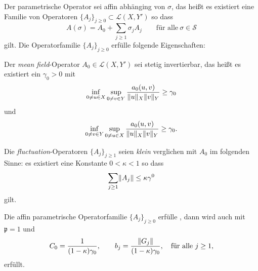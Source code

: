 \begin{Annahme}
    \label{thm:kunoth:assumption2}
    Der parametrische Operator sei affin abhänging von $\sigma$, das heißt es existiert eine Familie von Operatoren $\{A_{j}\}_{j \geq 0} \subset \mathcal L(X, Y')$ so dass
    \begin{equation}
        A(\sigma) = A_{0} + \sum_{j \geq 1} \sigma_{j} A_{j} \qquad\text{für alle}~\sigma \in \mathcal S
    \end{equation}
    gilt.
    Die Operatorfamilie $\{ A_{j} \}_{j \geq 0}$ erfülle folgende Eigenschaften:
    \begin{thmenumerate}
        \item Der \emph{mean field}-Operator $A_{0} \in \mathcal L(X, Y')$ sei stetig invertierbar, das heißt es existiert ein $\gamma_{0} > 0$ mit
        \begin{equation}
            \inf_{0 \neq u \in X} \sup_{0 \neq v \in Y} \frac{a_{0}(u, v)}{\lVert u\rVert_{X} \lVert v\rVert_{Y}} \geq \gamma_{0}
        \end{equation}
        und
        \begin{equation}
            \inf_{0 \neq v \in Y} \sup_{0 \neq u \in X} \frac{a_{0}(u, v)}{\lVert u\rVert_{X} \lVert v\rVert_{Y}} \geq \gamma_{0}.
        \end{equation}
        \item Die \emph{fluctuation}-Operatoren $\{ A_{j} \}_{j \geq 1}$ seien \emph{klein} verglichen mit $A_{0}$ im folgenden Sinne: es existiert eine Konstante $0 < \kappa < 1$ so dass
        \begin{equation}
            \sum_{j \geq 1} \lVert A_{j}\rVert \leq \kappa \gamma^{0}
        \end{equation}
        gilt.
    \end{thmenumerate}
\end{Annahme}

\begin{Korollar}
    \label{thm:kunoth:corollary3}
    Die affin parametrische Operatorfamilie $\{ A_{j} \}_{j \geq 0}$ erfülle , dann wird auch  mit $\mathfrak p = 1$ und
    \begin{equation}
        C_{0} = \frac{1}{(1 - \kappa) \gamma_{0}}, \qquad b_{j} = \frac{\lVert G_{j}\rVert}{(1 - \kappa) \gamma_{0}}, \quad \text{für alle}~j \geq 1,
    \end{equation}
    erfüllt.
\end{Korollar}

